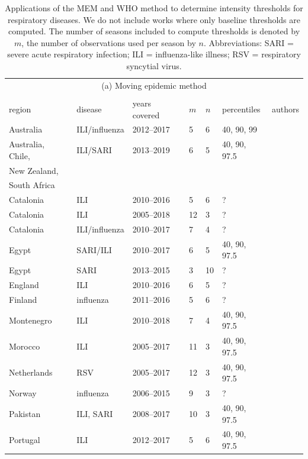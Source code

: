 \documentclass{article}
\begin{document}
\begin{table}[h!]
\caption{Applications of the MEM and WHO method to determine intensity thresholds for respiratory diseases. We do not include works where only baseline thresholds are computed. The number of seasons included to compute thresholds is denoted by $m$, the number of observations used per season by $n$. Abbreviations: SARI = severe acute respiratory infection; ILI = influenza-like illness; RSV = respiratory syncytial virus.}
\label{tab:literature}
\center
\footnotesize
\begin{tabular}{l l l l l l l}
\multicolumn{7}{c}{(a) Moving epidemic method}\\ \\

\toprule
region & disease & years covered & $m$ & $n$ & percentiles & authors\\
\midrule
Australia & ILI/influenza & 2012--2017 & 5 & 6 & 40, 90, 99 & \cite{Vette2018}\\
Australia, Chile, & ILI/SARI & 2013--2019 & 6 & 5 & 40, 90, 97.5 & \cite{Sullivan2019}\\
New Zealand,\\
South Africa\\
Catalonia & ILI & 2010--2016 & 5 & 6 & ? & \cite{Basile2018}\\
Catalonia & ILI & 2005--2018 & 12 & 3 & ? & \cite{Basile2019}\\
Catalonia & ILI/influenza & 2010--2017 & 7 & 4 & ? & \cite{Torner2019}\\
Egypt & SARI/ILI & 2010--2017 & 6 & 5 & 40, 90, 97.5 & \cite{AbdElGawad2020}\\
Egypt & SARI & 2013--2015 & 3 & 10 & ? & \cite{Elhakim2019}\\
England & ILI & 2010--2016 & 6 & 5 & ? & \cite{Wagner2018}\\
Finland & influenza & 2011--2016 & 5 & 6 & ? & \cite{Pesaelae2019}\\
Montenegro & ILI & 2010--2018 & 7 & 4 & 40, 90, 97.5 & \cite{Rakocevic2019}\\
Morocco & ILI & 2005--2017 & 11 & 3 & 40, 90, 97.5 & \cite{Rguig2020}\\
Netherlands & RSV & 2005--2017 & 12 & 3 & 40, 90, 97.5 & \cite{Vos2019}\\
Norway & influenza & 2006--2015 & 9 & 3 & ? & \cite{Benedetti2019}\\
Pakistan & ILI, SARI & 2008--2017 & 10 & 3 & 40, 90, 97.5 & \cite{Nisar2020}\\
Portugal & ILI & 2012--2017 & 5 & 6 & 40, 90, 97.5 & \cite{Pascoa2018}\\

\end{tabular}
\end{table}
\end{document}
